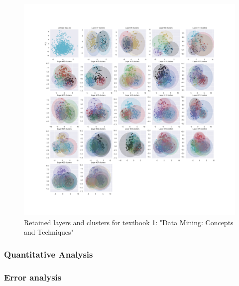 \begin{figure}[t]
	\centering	
	\includegraphics[width=1\textwidth]{figures/han_bidi_clusters_1.png}
	\caption{Retained layers and clusters for textbook 1: "Data Mining: Concepts and Techniques"}
	\label{han_clusters}
\end{figure}

\subsubsection{Quantitative Analysis}\label{quantitative}


\subsubsection{Error analysis}\label{error}

